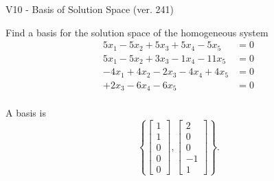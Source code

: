 \begin{exercise}
  \begin{exerciseTitle}V10 - Basis of Solution Space (ver. 241)\end{exerciseTitle}
  \begin{exerciseStatement}
    Find a basis for the solution space of the homogeneous system 
\begin{align*}
 5 x_ 1 -5 x_ 2 + 5 x_ 3 + 5 x_ 4 -5 x_ 5 &= 0  \\ 
  5 x_ 1 -5 x_ 2 + 3 x_ 3 -1 x_ 4 -11 x_ 5 &= 0  \\ 
  -4 x_ 1 + 4 x_ 2 -2 x_ 3 -4 x_ 4 + 4 x_ 5 &= 0  \\ 
  + 2 x_ 3 -6 x_ 4 -6 x_ 5 &= 0  \\ 
 \end{align*}


 
  \end{exerciseStatement}

  \begin{exerciseAnswer}
   A basis is   
\[\left\{\left[\begin{array}{c}
1 \\
1 \\
0 \\
0 \\
0
\end{array}\right] , \left[\begin{array}{c}
2 \\
0 \\
0 \\
-1 \\
1
\end{array}\right]\right\}.\]

  


  \end{exerciseAnswer}
\end{exercise}